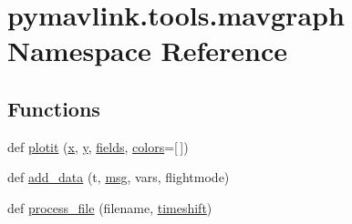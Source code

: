 \hypertarget{namespacepymavlink_1_1tools_1_1mavgraph}{}\section{pymavlink.\+tools.\+mavgraph Namespace Reference}
\label{namespacepymavlink_1_1tools_1_1mavgraph}
\subsection*{Functions}
\begin{DoxyCompactItemize}
\item 
def \mbox{\hyperlink{namespacepymavlink_1_1tools_1_1mavgraph_ac4c25ed1ed8661bb69619e15992c1c81}{plotit}} (\mbox{\hyperlink{namespacepymavlink_1_1tools_1_1mavgraph_a850833f299bc2444a4e9077175f357cb}{x}}, \mbox{\hyperlink{namespacepymavlink_1_1tools_1_1mavgraph_a2083829da277f3d120e2db2239c5ede9}{y}}, \mbox{\hyperlink{namespacepymavlink_1_1tools_1_1mavgraph_a5ba6a459d544d32a7adf561bba2386d2}{fields}}, \mbox{\hyperlink{namespacepymavlink_1_1tools_1_1mavgraph_a19862d005460bc9f0c104743009a0ff1}{colors}}=\mbox{[}$\,$\mbox{]})
\item 
def \mbox{\hyperlink{namespacepymavlink_1_1tools_1_1mavgraph_a798da2b2c7d6fe51f1eecc3dcba95079}{add\+\_\+data}} (t, \mbox{\hyperlink{stratnode_8cpp_a82cfe4ed9bc9e1b07c8bf209c324d85b}{msg}}, vars, flightmode)
\item 
def \mbox{\hyperlink{namespacepymavlink_1_1tools_1_1mavgraph_a47959158ff9478cba6dd7fb7000655ea}{process\+\_\+file}} (filename, \mbox{\hyperlink{namespacepymavlink_1_1tools_1_1mavgraph_a3e1ff395cb61a46b7bfcd65d9562d82b}{timeshift}})
\end{DoxyCompactItemize}
